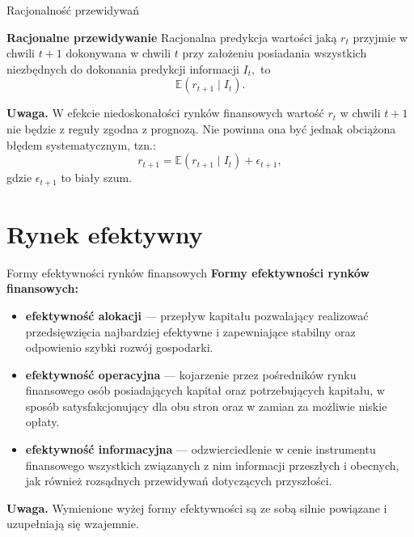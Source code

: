 \documentclass[a4paper, 11pt]{beamer}
\begin{document}
	\begin{frame}{Racjonalność przewidywań}
		\begin{block}{\textbf{Racjonalne przewidywanie}}
			Racjonalna predykcja wartości jaką $r_t$ przyjmie w chwili $t+1$ dokonywana w chwili $t$ przy założeniu
			posiadania wszystkich niezbędnych do dokonania predykcji informacji $I_t,$ to \[
				\mathbb{E}\left(r_{t+1} \mid I_t\right).
			\]
		\end{block}
		\begin{alert}{\textbf{Uwaga.}}
			W efekcie niedoskonałości rynków finansowych wartość $r_t$ w chwili $t+1$ nie będzie z reguły zgodna
			z prognozą. Nie powinna ona być jednak obciążona błędem systematycznym, tzn.: \[
				r_{t+1} = \mathbb{E}\left(r_{t+1} \mid I_t\right) + \epsilon_{t+1},
			\] gdzie $\epsilon_{t+1}$ to biały szum.
		\end{alert}
	\end{frame}
	
	\section{Rynek efektywny}
	
	\begin{frame}{Formy efektywności rynków finansowych}
		\textbf{Formy efektywności rynków finansowych:}
		\begin{itemize}
			\item \textbf{efektywność alokacji} --- przepływ kapitału pozwalający realizować
				przedsięwzięcia najbardziej efektywne i zapewniające stabilny oraz odpowienio szybki
				rozwój gospodarki.
			\item \textbf{efektywność operacyjna} --- kojarzenie przez pośredników rynku finansowego
				osób posiadających kapitał oraz potrzebujących kapitału, w sposób satysfakcjonujący dla
				obu stron oraz w zamian za możliwie niskie opłaty.
			\item \textbf{efektywność informacyjna} --- odzwierciedlenie w cenie instrumentu finansowego
				wszystkich związanych z nim informacji przeszłych i obecnych, jak również rozsądnych
				przewidywań dotyczących przyszłości.
		\end{itemize}
		\begin{alert}{\textbf{Uwaga.}}
			Wymienione wyżej formy efektywności są ze sobą silnie powiązane i uzupełniają się wzajemnie.
		\end{alert}
	\end{frame}
	
\end{document}
